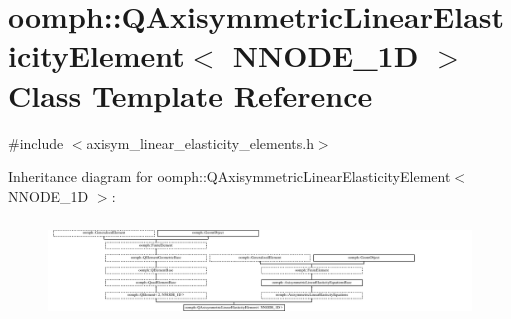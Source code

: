\hypertarget{classoomph_1_1QAxisymmetricLinearElasticityElement}{}\section{oomph\+:\+:Q\+Axisymmetric\+Linear\+Elasticity\+Element$<$ N\+N\+O\+D\+E\+\_\+1D $>$ Class Template Reference}
\label{classoomph_1_1QAxisymmetricLinearElasticityElement}


{\ttfamily \#include $<$axisym\+\_\+linear\+\_\+elasticity\+\_\+elements.\+h$>$}

Inheritance diagram for oomph\+:\+:Q\+Axisymmetric\+Linear\+Elasticity\+Element$<$ N\+N\+O\+D\+E\+\_\+1D $>$\+:\begin{figure}[H]
\begin{center}
\leavevmode
\includegraphics[height=2.655826cm]{classoomph_1_1QAxisymmetricLinearElasticityElement}
\end{center}
\end{figure}
